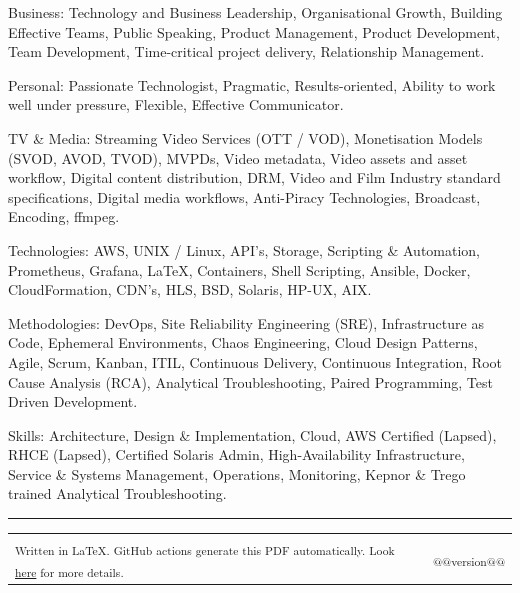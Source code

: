\documentclass[10pt,a4paper]{article}
\makeatletter
\newenvironment{indentsection}[1]%
{\begin{list}{}%
	{\setlength{\leftmargin}{#1}}%
	\item[]%
}
{\end{list}}
\newcommand{\headerrow}[2]
{\begin{tabular*}{\linewidth}{l@{\extracolsep{\fill}}r}
	#1 &
	#2 \\
\end{tabular*}}
\makeatother
\begin{document}
\begin{indentsection}{\parindent}
\begin{description*}
		\item[Business:]
		Technology and Business Leadership, Organisational Growth, Building Effective Teams, Public Speaking, Product Management, Product Development, Team Development, Time-critical project delivery, Relationship Management.
    \item[Personal:]
		Passionate Technologist, Pragmatic, Results-oriented, Ability to work well under pressure, Flexible, Effective Communicator.
    \item[TV \& Media:]
    Streaming Video Services (OTT / VOD), Monetisation Models (SVOD, AVOD, TVOD), MVPDs, Video metadata, Video assets and asset workflow, Digital content distribution, DRM, Video and Film Industry standard specifications, Digital media workflows, Anti-Piracy Technologies, Broadcast, Encoding, ffmpeg.
    \item[Technologies:]
    AWS, UNIX / Linux, API's, Storage, Scripting \& Automation, Prometheus, Grafana, \LaTeX, Containers, Shell Scripting, Ansible, Docker, CloudFormation, CDN's, HLS, BSD, Solaris, HP-UX, AIX.
    \item[Methodologies:]
    DevOps, Site Reliability Engineering (SRE), Infrastructure as Code, Ephemeral Environments, Chaos Engineering, Cloud Design Patterns, Agile, Scrum, Kanban, ITIL, Continuous Delivery, Continuous Integration, Root Cause Analysis (RCA), Analytical Troubleshooting, Paired Programming, Test Driven Development.
    \item[Skills:]
    Architecture, Design \& Implementation, Cloud, AWS Certified (Lapsed), RHCE (Lapsed), Certified Solaris Admin, High-Availability Infrastructure, Service \& Systems Management, Operations, Monitoring, Kepnor \& Trego trained Analytical Troubleshooting.

\end{description*}
\end{indentsection}

\hrule
\vspace{-0.4em}

\begin{description*}
  	\item
  \headerrow
    {{\textsubscript{Written in \LaTeX. GitHub actions generate this PDF automatically. Look \href{https://github.com/robert-will-brown/cv}{here} for more details.}}}
    {{\textsubscript{@@version@@}}}

\end{description*}
\end{document}
